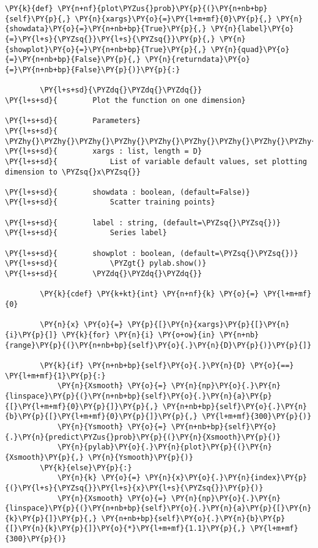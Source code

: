 \begin{Verbatim}[commandchars=\\\{\}]
    \PY{k}{def} \PY{n+nf}{plot\PYZus{}prob}\PY{p}{(}\PY{n+nb+bp}{self}\PY{p}{,} \PY{n}{xargs}\PY{o}{=}\PY{l+m+mf}{0}\PY{p}{,} \PY{n}{showdata}\PY{o}{=}\PY{n+nb+bp}{True}\PY{p}{,} \PY{n}{label}\PY{o}{=}\PY{l+s}{\PYZsq{}}\PY{l+s}{\PYZsq{}}\PY{p}{,} \PY{n}{showplot}\PY{o}{=}\PY{n+nb+bp}{True}\PY{p}{,} \PY{n}{quad}\PY{o}{=}\PY{n+nb+bp}{False}\PY{p}{,} \PY{n}{returndata}\PY{o}{=}\PY{n+nb+bp}{False}\PY{p}{)}\PY{p}{:}

        \PY{l+s+sd}{\PYZdq{}\PYZdq{}\PYZdq{}}
\PY{l+s+sd}{        Plot the function on one dimension}

\PY{l+s+sd}{        Parameters}
\PY{l+s+sd}{        \PYZhy{}\PYZhy{}\PYZhy{}\PYZhy{}\PYZhy{}\PYZhy{}\PYZhy{}\PYZhy{}\PYZhy{}\PYZhy{}\PYZhy{}}
\PY{l+s+sd}{        xargs : list, length = D}
\PY{l+s+sd}{            List of variable default values, set plotting dimension to \PYZsq{}x\PYZsq{}}

\PY{l+s+sd}{        showdata : boolean, (default=False)}
\PY{l+s+sd}{            Scatter training points}

\PY{l+s+sd}{        label : string, (default=\PYZsq{}\PYZsq{})}
\PY{l+s+sd}{            Series label}

\PY{l+s+sd}{        showplot : boolean, (default=\PYZsq{}\PYZsq{})}
\PY{l+s+sd}{            \PYZgt{} pylab.show()}
\PY{l+s+sd}{        \PYZdq{}\PYZdq{}\PYZdq{}}

        \PY{k}{cdef} \PY{k+kt}{int} \PY{n+nf}{k} \PY{o}{=} \PY{l+m+mf}{0}
        
        \PY{n}{x} \PY{o}{=} \PY{p}{[}\PY{n}{xargs}\PY{p}{[}\PY{n}{i}\PY{p}{]} \PY{k}{for} \PY{n}{i} \PY{o+ow}{in} \PY{n+nb}{range}\PY{p}{(}\PY{n+nb+bp}{self}\PY{o}{.}\PY{n}{D}\PY{p}{)}\PY{p}{]}

        \PY{k}{if} \PY{n+nb+bp}{self}\PY{o}{.}\PY{n}{D} \PY{o}{==} \PY{l+m+mf}{1}\PY{p}{:}
            \PY{n}{Xsmooth} \PY{o}{=} \PY{n}{np}\PY{o}{.}\PY{n}{linspace}\PY{p}{(}\PY{n+nb+bp}{self}\PY{o}{.}\PY{n}{a}\PY{p}{[}\PY{l+m+mf}{0}\PY{p}{]}\PY{p}{,} \PY{n+nb+bp}{self}\PY{o}{.}\PY{n}{b}\PY{p}{[}\PY{l+m+mf}{0}\PY{p}{]}\PY{p}{,} \PY{l+m+mf}{300}\PY{p}{)}
            \PY{n}{Ysmooth} \PY{o}{=} \PY{n+nb+bp}{self}\PY{o}{.}\PY{n}{predict\PYZus{}prob}\PY{p}{(}\PY{n}{Xsmooth}\PY{p}{)}
            \PY{n}{pylab}\PY{o}{.}\PY{n}{plot}\PY{p}{(}\PY{n}{Xsmooth}\PY{p}{,} \PY{n}{Ysmooth}\PY{p}{)}
        \PY{k}{else}\PY{p}{:}
            \PY{n}{k} \PY{o}{=} \PY{n}{x}\PY{o}{.}\PY{n}{index}\PY{p}{(}\PY{l+s}{\PYZsq{}}\PY{l+s}{x}\PY{l+s}{\PYZsq{}}\PY{p}{)}
            \PY{n}{Xsmooth} \PY{o}{=} \PY{n}{np}\PY{o}{.}\PY{n}{linspace}\PY{p}{(}\PY{n+nb+bp}{self}\PY{o}{.}\PY{n}{a}\PY{p}{[}\PY{n}{k}\PY{p}{]}\PY{p}{,} \PY{n+nb+bp}{self}\PY{o}{.}\PY{n}{b}\PY{p}{[}\PY{n}{k}\PY{p}{]}\PY{o}{*}\PY{l+m+mf}{1.1}\PY{p}{,} \PY{l+m+mf}{300}\PY{p}{)}


\end{Verbatim}
